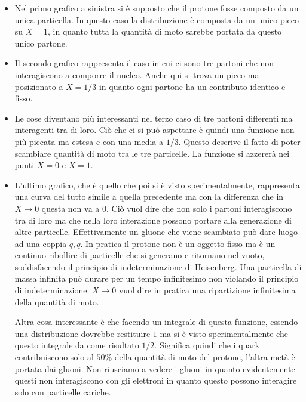 \begin{itemize}
\item Nel primo grafico a sinistra si è supposto che il protone fosse composto da un unica particella.
In questo caso la distribuzione è composta da un unico picco su $X=1$, in quanto tutta la quantità di moto sarebbe portata da questo unico partone.

\item Il secondo grafico rappresenta il caso in cui ci sono tre partoni che non interagiscono a comporre il nucleo.
Anche qui si trova un picco ma posizionato a $X=1/3$ in quanto ogni partone ha un contributo identico e fisso.

\item Le cose diventano più interessanti nel terzo caso di tre partoni differenti ma interagenti tra di loro.
Ciò che ci si può aspettare è quindi una funzione non più piccata ma estesa e con una media a $1/3$.
Questo descrive il fatto di poter scambiare quantità di moto tra le tre particelle.
La funzione si azzererà nei punti $X=0$ e $X=1$.

\item L'ultimo grafico, che è quello che poi si è visto sperimentalmente, rappresenta una curva del tutto simile a quella precedente ma con la differenza che in $X\to 0$ questa non va a $0$.
Ciò vuol dire che non solo i partoni interagiscono tra di loro ma che nella loro interazione possono portare alla generazione di altre particelle.
Effettivamente un gluone che viene scambiato può dare luogo ad una coppia $q, \bar{q}$.
In pratica il protone non è un oggetto fisso ma è un continuo ribollire di particelle che si generano e ritornano nel vuoto, soddisfacendo il principio di indeterminazione di Heisenberg.
Una particella di massa infinita può durare per un tempo infinitesimo non violando il principio di indeterminazione.
$X\to 0$ vuol dire in pratica una ripartizione infinitesima della quantità di moto.

Altra cosa interessante è che facendo un integrale di questa funzione, essendo una distribuzione dovrebbe restituire $1$ ma si è visto sperimentalmente che questo integrale da come risultato $1/2$.
Significa quindi che i quark contribuiscono solo al $50\%$ della quantità di moto del protone, l'altra metà è portata dai gluoni.
Non riusciamo a vedere i gluoni in quanto evidentemente questi non interagiscono con gli elettroni in quanto questo possono interagire solo con particelle cariche.
\end{itemize}

